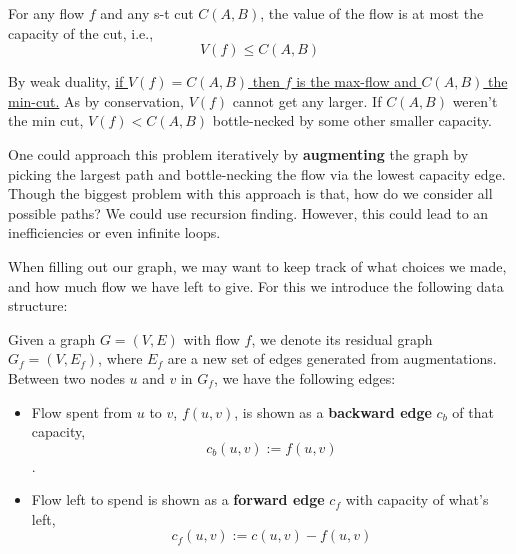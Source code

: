 \begin{Def}

    For any flow $f$ and any s-t cut $C(A,B)$, the value of the flow is at most the capacity of the cut, i.e.,
    \begin{equation}
        V(f) \leq C(A,B)
    \end{equation}
\end{Def}

\begin{Def}

    By weak duality, \underline{if $V(f)=C(A,B)$ then $f$ is the max-flow and $C(A,B)$ the min-cut.} As by 
    conservation, $V(f)$ cannot get any larger. If $C(A,B)$ weren't the min cut,
    $V(f)<C(A,B)$ bottle-necked by some other smaller capacity.
\end{Def}

\noindent
One could approach this problem iteratively by \textbf{augmenting} the graph by picking the largest path and 
bottle-necking the flow via the lowest capacity edge.\\

\noindent
Though the biggest problem with this approach is that, how do we consider all possible paths? We
could use recursion finding. However, this could lead to an inefficiencies or even infinite loops.

\newpage
\noindent
When filling out our graph, we may want to keep track of what choices we made, and how much flow we have left to give.
For this we introduce the following data structure:
\begin{Def}

    Given a graph $G=(V,E)$ with flow $f$, we denote its residual graph $G_f = (V,E_f)$, where $E_f$ are a new set of edges generated from augmentations.
    Between two nodes $u$ and $v$ in $G_f$, we have the following edges:
    \begin{itemize}
        \item Flow spent from $u$ to $v$, $f(u,v)$, is shown as a \textbf{backward edge} $c_b$ of that capacity, $$c_b(u,v):= f(u,v)$$.
        
        \vspace{-2em}
        \item Flow left to spend is shown as a \textbf{forward edge} $c_f$ with capacity of what's left, $$c_f(u,v) := c(u,v) - f(u,v)$$
    \end{itemize}

    \vspace{-1em}
\end{Def}


